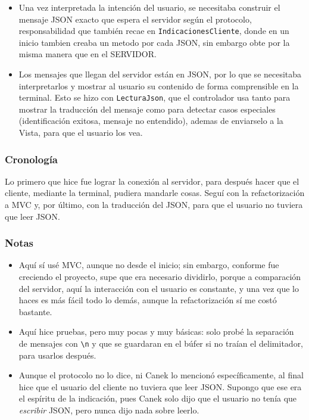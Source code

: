 \documentclass{article}
\begin{document}
\begin{itemize}
    \item Una vez interpretada la intención del usuario, se necesitaba
    construir el mensaje JSON exacto que espera el servidor según el
    protocolo, responsabilidad que también recae en \texttt{IndicacionesCliente}, donde en un inicio tambien creaba un metodo por cada JSON, sin embargo obte por la misma manera que en el SERVIDOR.

    \item Los mensajes que llegan del servidor están en JSON, por lo que se
    necesitaba interpretarlos y mostrar al usuario su contenido de forma
    comprensible en la terminal. Esto se hizo con \texttt{LecturaJson}, que
    el controlador usa tanto para mostrar la traducción del mensaje como para
    detectar casos especiales (identificación exitosa, mensaje no entendido), ademas de enviarselo a la Vista, para que el usuario los vea.
\end{itemize}

\subsubsection{Cronología}
Lo primero que hice fue lograr la conexión al servidor, para después hacer que
el cliente, mediante la terminal, pudiera mandarle cosas. Seguí con la
refactorización a MVC y, por último, con la traducción del JSON, para que el
usuario no tuviera que leer JSON.

\subsubsection{Notas}

\begin{itemize}
    \item Aquí sí usé MVC, aunque no desde el inicio; sin embargo, conforme
    fue creciendo el proyecto, supe que era necesario dividirlo, porque a
    comparación del servidor, aquí la interacción con el usuario es
    constante, y una vez que lo haces es más fácil todo lo demás, aunque la
    refactorización sí me costó bastante.

    \item Aquí hice pruebas, pero muy pocas y muy básicas: solo probé la
    separación de mensajes con \texttt{\textbackslash n} y que se guardaran
    en el búfer si no traían el delimitador, para usarlos después.

    \item Aunque el protocolo no lo dice, ni Canek lo mencionó específicamente,
    al final hice que el usuario del cliente no tuviera que leer JSON.
    Supongo que ese era el espíritu de la indicación, pues Canek solo dijo
    que el usuario no tenía que \emph{escribir} JSON, pero nunca dijo nada
    sobre leerlo.
\end{itemize}
\end{document}
